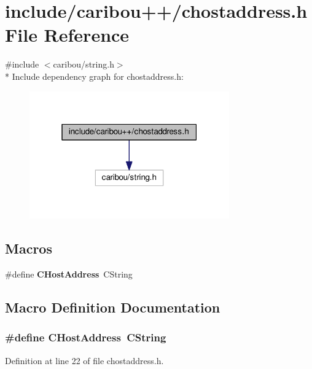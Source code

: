 \section{include/caribou++/chostaddress.h File Reference}
\label{chostaddress_8h}
{\ttfamily \#include $<$caribou/string.\+h$>$}\\*
Include dependency graph for chostaddress.\+h\+:
\nopagebreak
\begin{figure}[H]
\begin{center}
\leavevmode
\includegraphics[width=244pt]{chostaddress_8h__incl}
\end{center}
\end{figure}
\subsection*{Macros}
\begin{DoxyCompactItemize}
\item 
\#define {\bf C\+Host\+Address}~C\+String
\end{DoxyCompactItemize}


\subsection{Macro Definition Documentation}
\subsubsection[{C\+Host\+Address}]{\setlength{\rightskip}{0pt plus 5cm}\#define C\+Host\+Address~C\+String}\label{chostaddress_8h_a6625b164e26a513f67e667d330884baf}


Definition at line 22 of file chostaddress.\+h.

